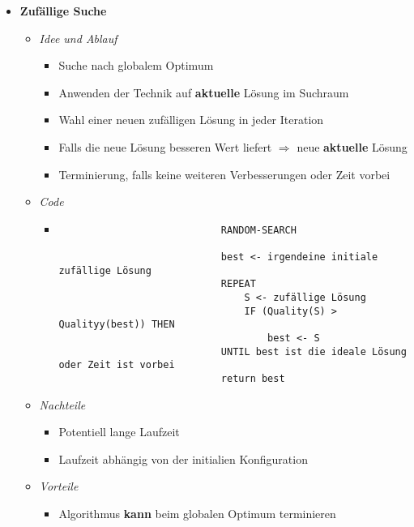 \begin{itemize}
        \item \textbf{Zufällige Suche}
            \begin{itemize}
                \item \textit{Idee und Ablauf}
                    \begin{itemize}
                        \item Suche nach globalem Optimum
                        \item Anwenden der Technik auf \textbf{aktuelle} Lösung im Suchraum
                        \item Wahl einer neuen zufälligen Lösung in jeder Iteration
                        \item Falls die neue Lösung besseren Wert liefert $\Rightarrow$ neue \textbf{aktuelle} Lösung
                        \item Terminierung, falls keine weiteren Verbesserungen oder Zeit vorbei
                    \end{itemize}
                \item \textit{Code}
                    \begin{itemize}
                        \item[]
                            \begin{verbatim}
                            RANDOM-SEARCH

                            best <- irgendeine initiale zufällige Lösung
                            REPEAT
                                S <- zufällige Lösung
                                IF (Quality(S) > Qualityy(best)) THEN
                                    best <- S
                            UNTIL best ist die ideale Lösung oder Zeit ist vorbei
                            return best
                            \end{verbatim}
                    \end{itemize}
                \item \textit{Nachteile}
                    \begin{itemize}
                        \item Potentiell lange Laufzeit
                        \item Laufzeit abhängig von der initialien Konfiguration
                    \end{itemize}
                \item \textit{Vorteile}
                    \begin{itemize}
                        \item Algorithmus \textbf{kann} beim globalen Optimum terminieren
                    \end{itemize}
            \end{itemize}


\end{itemize}

